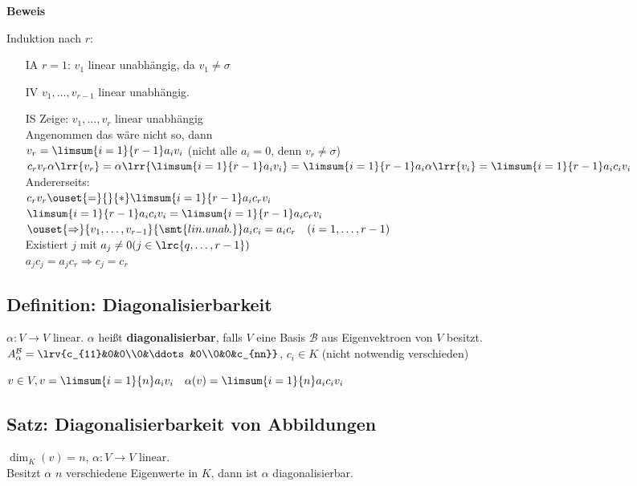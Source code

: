	\textbf{Beweis}

	Induktion nach $r$:
	\begin{itemize}
		\item[IA] $r=1$: $v_1$ linear unabhängig, da $v_1\neq\sigma$
		\item[IV] $v_1,\dots,v_{r-1}$ linear unabhängig.
		\item[IS] Zeige: $v_1,\dots,v_r$ linear unabhängig\\
			Angenommen das wäre nicht so, dann\\
			$v_r=\limsum{i=1}{r-1}a_iv_i$ (nicht alle $a_i=0$, denn $v_r\neq\sigma$)\\
			$c_rv_r\alpha\lrr{v_r}=\alpha\lrr{\limsum{i=1}{r-1}a_iv_i}=\limsum{i=1}{r-1}a_i\alpha\lrr{v_i}=\limsum{i=1}{r-1}a_ic_iv_i$\\
			Andererseits:\\
			$c_rv_r\ouset{=}{}{*}\limsum{i=1}{r-1}a_ic_rv_i$\\
			$\limsum{i=1}{r-1}a_ic_iv_i=\limsum{i=1}{r-1}a_ic_rv_i$\\
			$\ouset{\Rightarrow}{v_1,\dots,v_{r-1}}{\smt{lin. unab.}}a_ic_i=a_ic_r\quad (i=1,\dots,r-1)$\\
			Existiert $j$ mit $a_j\neq 0 (j\in\lrc{q,\dots,r-1})$\\
			$a_jc_j=a_jc_r\Rightarrow c_j=c_r$\lightning
	\end{itemize}

\subsection{Definition: Diagonalisierbarkeit}
	$\alpha:V\rightarrow V$ linear. $\alpha$ heißt \textbf{diagonalisierbar}, falls $V$ eine Basis $\mathcal{B}$ aus Eigenvektroen von $V$ besitzt.\\
	$A_\alpha^\mathcal{B}=\lrv{c_{11}&0&0\\0&\ddots&0\\0&0&c_{nn}}$, $c_i\in K$ (nicht notwendig verschieden)

	$v\in V, v=\limsum{i=1}{n}a_iv_i\quad \alpha(v)=\limsum{i=1}{n}a_ic_iv_i$

\subsection{Satz: Diagonalisierbarkeit von Abbildungen}
	$\dim_K(v)=n$, $\alpha:V\rightarrow V$ linear.\\
	Besitzt $\alpha$ $n$ verschiedene Eigenwerte in $K$, dann ist $\alpha$ diagonalisierbar.

